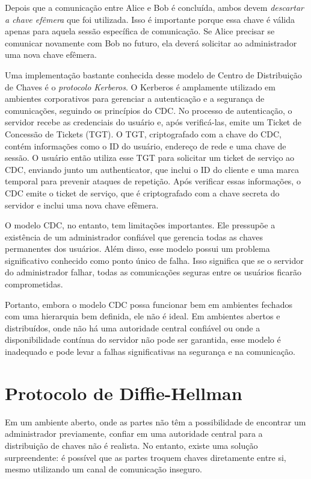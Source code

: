 Depois que a comunicação entre Alice e Bob é concluída, ambos devem {\em descartar a chave efêmera} que foi utilizada.
Isso é importante porque essa chave é válida apenas para aquela sessão específica de comunicação.
Se Alice precisar se comunicar novamente com Bob no futuro, ela deverá solicitar ao administrador uma nova chave efêmera.


Uma implementação bastante conhecida desse modelo de Centro de Distribuição de Chaves é o {\em protocolo Kerberos}.
O Kerberos é amplamente utilizado em ambientes corporativos para gerenciar a autenticação e a segurança de comunicações, seguindo os princípios do CDC.
No processo de autenticação, o servidor recebe as credenciais do usuário e, após verificá-las, emite um Ticket de Concessão de Tickets (TGT).
O TGT, criptografado com a chave do CDC, contém informações como o ID do usuário, endereço de rede e uma chave de sessão.
O usuário então utiliza esse TGT para solicitar um ticket de serviço ao CDC, enviando junto um authenticator, que inclui o ID do cliente e uma marca temporal para prevenir ataques de repetição.
Após verificar essas informações, o CDC emite o ticket de serviço, que é criptografado com a chave secreta do servidor e inclui uma nova chave efêmera.

O modelo CDC, no entanto, tem limitações importantes.
Ele pressupõe a existência de um administrador confiável que gerencia todas as chaves permanentes dos usuários.
Além disso, esse modelo possui um problema significativo conhecido como ponto único de falha.
Isso significa que se o servidor do administrador falhar, todas as comunicações seguras entre os usuários ficarão comprometidas.

Portanto, embora o modelo CDC possa funcionar bem em ambientes fechados com uma hierarquia bem definida, ele não é ideal.
Em ambientes abertos e distribuídos, onde não há uma autoridade central confiável ou onde a disponibilidade contínua do servidor não pode ser garantida, esse modelo é inadequado e pode levar a falhas significativas na segurança e na comunicação.

\section{Protocolo de Diffie-Hellman}
\label{sec:diffie-hellman}


Em um ambiente aberto, onde as partes não têm a possibilidade de encontrar um administrador previamente, confiar em uma autoridade central para a distribuição de chaves não é realista.
No entanto, existe uma solução surpreendente:
é possível que as partes troquem chaves diretamente entre si, mesmo utilizando um canal de comunicação inseguro.

